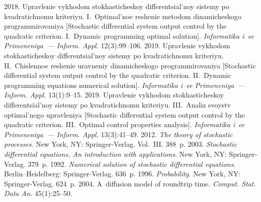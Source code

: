   \begin{multicols}{2}

\renewcommand{\bibname}{\protect\rmfamily References}

{\small\frenchspacing
 {%
 \begin{thebibliography}{9}
 2018. Upravlenie vykhodom 
stokhasticheskoy differentsial'noy sistemy po kvadratichnomu kriteriyu. 
I.~Optimal'noe reshenie metodom dinamicheskogo programmirovaniya 
[Stochastic differential system output control by the quadratic criterion. 
I.~Dynamic programming optimal solution]. \textit{Informatika i~ee 
Primeneniya~--- Inform. Appl.} 12(3):99--106.
 2019. Upravlenie vykhodom 
stokhasticheskoy differentsial'noy sistemy po kvadratichnomu kriteriyu. 
II.~Chislennoe reshenie uravneniy dinamicheskogo programmirovaniya 
[Stochastic differential system output control by the quadratic criterion. 
II.~Dynamic programming equations numerical solution]. \textit{Informatika 
i~ee Primeneniya~--- Inform. Appl.} 13(1):9--15.
 2019. Upravlenie vykhodom 
stokhasticheskoy differentsial'noy sistemy po kvadratichnomu kriteriyu. 
III.~Analiz svoystv optimal'nogo upravleniya [Stochastic differential system 
output control by the quadratic criterion. III.~Optimal control properties 
analysis]. \textit{Informatika i~ee Primeneniya~--- Inform. Appl.}
13(3):41--49.
 2012. \textit{The theory of stochastic 
processes}. New York, NY: Springer-Verlag. Vol.~III. 388~p.
 2003. \textit{Stochastic differential equations. An 
introduction with applications}. New York, NY: Springer-Verlag. 379~p.
 1992. \textit{Numerical solution of 
stochastic differential equations}. Berlin--Heidelberg: Springer-Verlag. 636~p.
 1996. \textit{Probability}. New York, NY:  
Springer-Verlag. 624~p.
 2004. A~diffusion model of roundtrip 
time. \textit{Comput. Stat. Data An.} 45(1):25--50.
\end{thebibliography}

 }
 }

\end{multicols}

